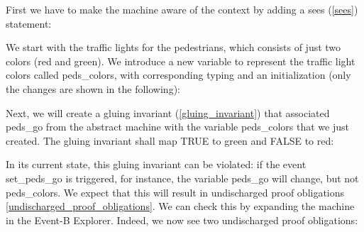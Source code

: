First we have to make the machine aware of the context by adding a \textsf{sees} (\ref{sees}) statement:


We start with the traffic lights for the pedestrians, which consists of just two colors (red and green).  We introduce a new variable to represent the traffic light colors called \textsf{peds\_colors}, with corresponding typing and an initialization (only the changes are shown in the following):


Next, we will create a gluing invariant (\ref{gluing_invariant}) that associated \textsf{peds\_go} from the abstract machine with the variable \textsf{peds\_colors} that we just created.  The gluing invariant shall map \textsf{TRUE} to \textsf{green} and \textsf{FALSE} to \textsf{red}:


In its current state, this gluing invariant can be violated: if the event \textsf{set\_peds\_go} is triggered, for instance, the variable \textsf{peds\_go} will change, but not \textsf{peds\_colors}.  We expect that this will result in undischarged proof obligations \ref{undischarged_proof_obligations}.  We can check this by expanding the machine in the Event-B Explorer.  Indeed, we now see two undischarged proof obligations:

